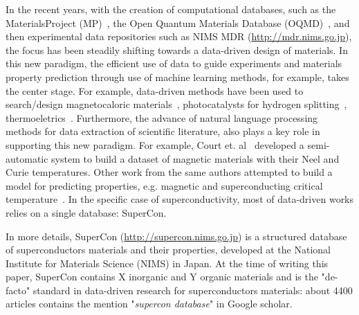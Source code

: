 \documentclass{article}
\begin{document}

In the recent years, with the creation of computational databases, such as the MaterialsProject (MP)~\cite{materialsprojectJain2013}, the Open Quantum Materials Database (OQMD)~\cite{oqmdkirklin2015open}, and then experimental data repositories such as NIMS MDR (\url{http://mdr.nims.go.jp}), the focus has been steadily shifting towards a data-driven design of materials. In this new paradigm, the efficient use of data to guide experiments and materials property prediction through use of machine learning methods, for example, takes the center stage. 
For example, data-driven methods have been used to search/design magnetocaloric materials~\cite{Bocarsly2017,Castro2020,court2021inverse}, photocatalysts for hydrogen splitting~\cite{xiong2021optimizing}, thermoeletrics~\cite{iwasaki2019machine}. Furthermore, the advance of natural language processing methods for data extraction of scientific literature, also plays a key role in supporting this new paradigm. For example, Court et. al~\cite{court2018auto} developed a semi-automatic system to build a dataset of magnetic materials with their Neel and Curie temperatures. 
Other work from the same authors attempted to build a model for predicting properties, e.g. magnetic and superconducting critical temperature~\cite{court_magnetic_2020}. In the specific case of superconductivity, most of data-driven works relies on a single database: SuperCon\cite{stanev_machine_2017, le2020critical,Hamlin2019SuperconductivityNR}.

In more details, SuperCon (\url{http://supercon.nims.go.jp}) is a structured database of superconductors materials and their properties, developed at the National Institute for Materials Science (NIMS) in Japan. 
At the time of writing this paper, SuperCon contains  X inorganic and Y organic materials and is the "de-facto" standard in data-driven research for superconductors materials: about 4400 articles contains the mention "\textit{supercon database}" in Google scholar. 
\end{document}
